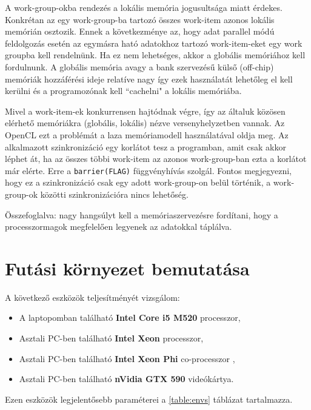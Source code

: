 	A work-group-okba rendezés a lokális memória jogusultsága miatt érdekes.
	Konkrétan az egy work-group-ba tartozó összes work-item azonos lokális memórián
	osztozik.
	Ennek a következménye az, hogy adat parallel módú feldolgozás esetén
	az egymásra ható adatokhoz tartozó work-item-eket egy work groupba kell
	rendelnünk.
	Ha ez nem lehetséges, akkor a globális memóriához kell fordulnunk.
	A globális memória avagy a bank szervezésű külső (off-chip) memóriák
	hozzáférési ideje relatíve nagy így ezek használatát lehetőleg el kell kerülni
	és a programozónak kell ``cachelni" a lokális memóriába.
	
	Mivel a work-item-ek konkurrensen hajtódnak végre, így az általuk közösen elérhető memóriákra
	(globális, lokális) nézve versenyhelyzetben vannak.
	Az OpenCL ezt a problémát a laza memóriamodell használatával oldja meg. Az alkalmazott
	szinkronizáció egy korlátot tesz a programban, amit csak akkor léphet át, ha az összes többi
	work-item az azonos work-group-ban ezta a korlátot már elérte. Erre a \texttt{barrier(FLAG)}
	függvényhívás szolgál. Fontos megjegyezni, hogy ez a szinkronizáció csak egy adott
	work-group-on belül történik, a work-group-ok közötti szinkronizációra nincs lehetőség. 
	
	\begin{center}
	Összefoglalva: nagy hangsúlyt kell a memóriaszervezésre fordítani, hogy a
	processzormagok megfelelően legyenek az adatokkal táplálva.
	\end{center}


\section{Futási környezet bemutatása}
	A következő eszközök teljesítményét vizsgálom:
	\begin{itemize}
		\item A laptopomban található \textbf{Intel Core i5 M520} processzor,
		\item Asztali PC-ben található \textbf{Intel Xeon} processzor,
 		\item Asztali PC-ben található \textbf{Intel Xeon Phi} co-processzor \cite{phi,mic},
 		\item Asztali PC-ben található  \textbf{nVidia GTX 590} videókártya.
	\end{itemize}
	Ezen eszközök legjelentősebb paraméterei a \ref{table:envs} táblázat tartalmazza.
	
